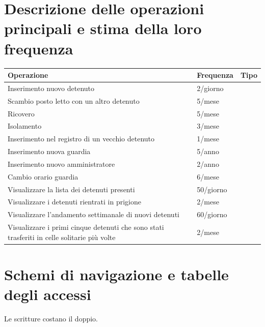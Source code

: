 \documentclass[a4paper,12pt]{report}
\begin{document}
\section{Descrizione delle operazioni principali e stima della loro frequenza}
\begin{table}[H]
\begin{tabular}{p{9cm} p{2cm} p{1cm}}
\hline
Operazione & Frequenza & Tipo \\ \hline
Inserimento nuovo detenuto & 2/giorno &  \\
Scambio posto letto con un altro detenuto & 5/mese &  \\
Ricovero & 5/mese & \\
Isolamento & 3/mese & \\
Inserimento nel registro di un vecchio detenuto & 1/mese & \\
Inserimento nuova guardia & 5/anno & \\
Inserimento nuovo amministratore & 2/anno & \\
Cambio orario guardia & 6/mese & \\
Visualizzare la lista dei detenuti presenti & 50/giorno & \\
Visualizzare i detenuti rientrati in prigione & 2/mese & \\
Visualizzare l'andamento settimanale di nuovi detenuti & 60/giorno & \\
Visualizzare i primi cinque detenuti che sono stati trasferiti in celle solitarie più volte & 2/mese &
\end{tabular}
\end{table}
\section{Schemi di navigazione e tabelle degli accessi}
Le scritture costano il doppio.
\end{document}
